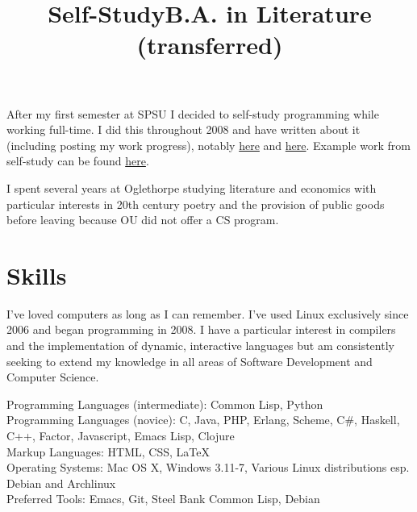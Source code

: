 \documentclass[margintitle,line]{res}
\begin{document}
\begin{resume}
\title{Self-Study}
\begin{position}
  After my first semester at SPSU I decided to self-study
  programming while working full-time. I did this
  throughout 2008 and have written about it
  (including posting my work progress), notably
  \href{http://redlinernotes.com/blog/?p=665}{here} and
  \href{http://redlinernotes.com/blog/?p=703}{here}.
  Example work from self-study can be found
  \href{http://redlinernotes.com/blog/?p=666}{here}.
\end{position}

\title{B.A. in Literature (transferred)}
\begin{position}
  I spent several years at Oglethorpe studying literature
  and economics with particular interests in 20th century
  poetry and the provision of public goods before leaving
  because OU did not offer a CS program.
\end{position}


\setlength{\parskip}{1ex}


\section{Skills}

I've loved computers as long as I can remember. I've used Linux exclusively
since 2006 and began programming in 2008. I have a particular interest in
compilers and the implementation of dynamic, interactive languages but am
consistently seeking to extend my knowledge in all areas of Software Development
and Computer Science.

Programming Languages (intermediate): Common Lisp, Python \\
Programming Languages (novice): C, Java, PHP, Erlang, Scheme, C\#, Haskell,
C++, Factor, Javascript, Emacs Lisp, Clojure \\
Markup Languages: HTML, CSS, LaTeX \\
Operating Systems: Mac OS X, Windows 3.11-7, Various Linux distributions
esp. Debian and Archlinux \\
Preferred Tools: Emacs, Git, Steel Bank Common Lisp, Debian \\


\end{resume}
\end{document}
